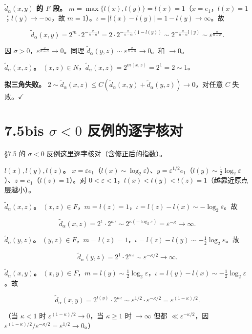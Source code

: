 \documentclass[a4paper,11pt,openany]{ctexbook}
\numberwithin{equation}{chapter}
\numberwithin{figure}{chapter}
\numberwithin{table}{chapter}
\begin{document}
\textbf{$\widetilde d_\alpha(x,y)$ 的 $F$ 段。} $m=\max\{l(x),l(y)\}=l(x)=1$（$x=e_1$，$l(x)=1$；$l(y)\to-\infty$，故 $m=1$）。$\iota=|l(x)-l(y)|=1-l(y)\to\infty$。故

$$\widetilde d_\alpha(x,y)=2^m\cdot2^{-\frac{\sigma}{n-\alpha}\iota}=2\cdot2^{-\frac{\sigma}{n-\alpha}(1-l(y))}\sim2^{-\frac{\sigma}{n-\alpha}l(y)}\sim\varepsilon^{\frac{\sigma}{n-\alpha}}.$$

因 $\sigma>0$，$\varepsilon^{\frac{\sigma}{n-\alpha}}\to0$。同理 $\widetilde d_\alpha(y,z)\sim\varepsilon^{\frac{\sigma}{n-\alpha}}\to0$。和 $\to0$。

\textbf{$\widetilde d_\alpha(x,z)$。} $(x,z)\in N$，$\widetilde d_\alpha(x,z)=2^{m(x,z)}=2^1=2\sim1$。

\textbf{拟三角失败。} $2\sim\widetilde d_\alpha(x,z)\le C(\widetilde d_\alpha(x,y)+\widetilde d_\alpha(y,z))\to0$，对任意 $C$ 失败。$\checkmark$

\section{7.5bis $\sigma<0$ 反例的逐字核对}

§7.5 的 $\sigma<0$ 反例这里逐字核对（含修正后的指数）。

\textbf{$l(x),l(y),l(z)$。} $x=\varepsilon e_1$（$l(x)\sim\log_2\varepsilon$）、$y=\varepsilon^{1/2}e_1$（$l(y)\sim\frac12\log_2\varepsilon$）、$z=e_1$（$l(z)=1$）。对 $0<\varepsilon<1$，$l(x)<l(y)<l(z)=1$（越靠近原点层越小）。

\textbf{$\widetilde d_\alpha(x,z)$。} $(x,z)\in F$，$m=l(z)=1$，$\iota=l(z)-l(x)\sim-\log_2\varepsilon$。故

$$\widetilde d_\alpha(x,z)=2^1\cdot2^{\kappa\,\iota}\sim2^{\kappa(-\log_2\varepsilon)}=\varepsilon^{-\kappa}\to\infty.$$

\textbf{$\widetilde d_\alpha(y,z)$。} $(y,z)\in F$，$m=l(z)=1$，$\iota=l(z)-l(y)\sim-\frac12\log_2\varepsilon$。故

$$\widetilde d_\alpha(y,z)=2^1\cdot2^{\kappa\,\iota}\sim\varepsilon^{-\kappa/2}\to\infty.$$

\textbf{$\widetilde d_\alpha(x,y)$。} $(x,y)\in F$，$m=l(y)\sim\frac12\log_2\varepsilon$，$\iota=l(y)-l(x)\sim-\frac12\log_2\varepsilon$。故

$$\widetilde d_\alpha(x,y)=2^{l(y)}\cdot2^{\kappa\,\iota}\sim\varepsilon^{1/2}\cdot\varepsilon^{-\kappa/2}=\varepsilon^{(1-\kappa)/2}.$$

（当 $\kappa<1$ 时 $\varepsilon^{(1-\kappa)/2}\to0$，当 $\kappa\ge1$ 时 $\to\infty$ 但都 $\ll\varepsilon^{-\kappa/2}$，因 $\varepsilon^{(1-\kappa)/2}/\varepsilon^{-\kappa/2}=\varepsilon^{1/2}\to0$。）
\end{document}
